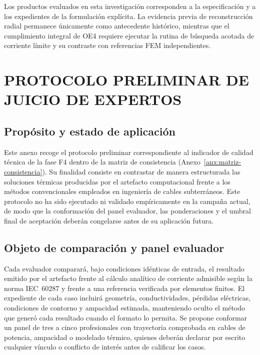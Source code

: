 Los productos evaluados en esta investigación corresponden a la especificación y a los expedientes de la formulación explícita. La evidencia previa de reconstrucción radial permanece únicamente como antecedente histórico, mientras que el cumplimiento integral de OE4 requiere ejecutar la rutina de búsqueda acotada de corriente límite y su contraste con referencias FEM independientes.

\section{PROTOCOLO PRELIMINAR DE JUICIO DE EXPERTOS}
\label{anx:protocolo-expertos}

\subsection*{Propósito y estado de aplicación}

Este anexo recoge el protocolo preliminar correspondiente al indicador de calidad técnica de la fase F4 dentro de la matriz de consistencia (Anexo~\ref{anx:matriz-consistencia}). Su finalidad consiste en contrastar de manera estructurada las soluciones térmicas producidas por el artefacto computacional frente a los métodos convencionales empleados en ingeniería de cables subterráneos. Este protocolo no ha sido ejecutado ni validado empíricamente en la campaña actual, de modo que la conformación del panel evaluador, las ponderaciones y el umbral final de aceptación deberán congelarse antes de su aplicación futura.

\subsection*{Objeto de comparación y panel evaluador}

Cada evaluador comparará, bajo condiciones idénticas de entrada, el resultado emitido por el artefacto frente al cálculo analítico de corriente admisible según la norma IEC~60287 \parencite{iec60287} y frente a una referencia verificada por elementos finitos. El expediente de cada caso incluirá geometría, conductividades, pérdidas eléctricas, condiciones de contorno y ampacidad estimada, manteniendo oculto el método que generó cada resultado cuando el formato lo permita. Se propone conformar un panel de tres a cinco profesionales con trayectoria comprobada en cables de potencia, ampacidad o modelado térmico, quienes deberán declarar por escrito cualquier vínculo o conflicto de interés antes de calificar los casos.

